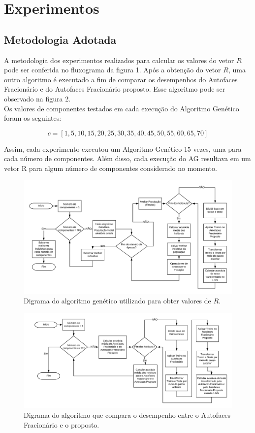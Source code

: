 \documentclass[12pt]{article}
\begin{document}
\section{Experimentos}

\subsection{Metodologia Adotada}
A metodologia dos experimentos realizados para calcular os valores do vetor $R$ pode ser conferida no fluxograma da figura 1. Após a obtenção do vetor $R$, uma outro algoritmo é executado a fim de comparar os desempenhos do Autofaces Fracionário e do Autofaces Fracionário proposto. Esse algoritmo pode ser observado na figura 2.\\
\indent Os valores de componentes testados em cada execução do Algoritmo Genético foram os seguintes:

$$c = [1, 5, 10, 15, 20, 25, 30, 35, 40, 45, 50, 55, 60, 65, 70]$$

Assim, cada experimento executou um Algoritmo Genético 15 vezes, uma para cada número de componentes. Além disso, cada execução do AG resultava em um vetor R para algum número de componentes considerado no momento.

\begin{figure}[!h] \centering
\includegraphics[scale=0.7]{diagrama1.png}
\caption{Digrama do algoritmo genético utilizado para obter valores de $R$.}
\end{figure}

\begin{figure}[!h] \centering
\includegraphics[scale=0.7]{diagrama2.png}
\caption{Digrama do algoritmo que compara o desempenho entre o Autofaces Fracionário e o proposto.}
\end{figure}
\end{document}
